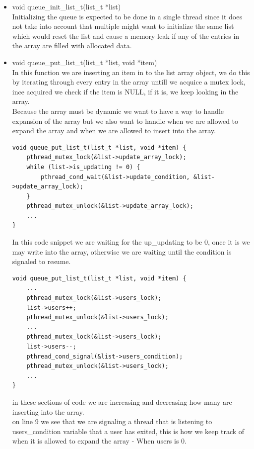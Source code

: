 \documentclass[a4paper,12pt,danish]{report}
\begin{document}
\begin{itemize}
  \item{void queue\_init\_list\_t(list\_t *list)}
  \\
  Initializing the queue is expected to be done in a single thread since it does not take into account that multiple might want to initialize the same list which would reset the list and cause a memory leak if any of the entries in the array are filled with allocated data.
  \item{void queue\_put\_list\_t(list\_t *list, void *item)}
  \\
  In this function we are inserting an item in to the list array object, we do this by iterating through every entry in the array untill we acquice a mutex lock, ince acquired we check if the item is NULL, if it is, we keep looking in the array.
  \\
  Because the array must be dynamic we want to have a way to handle expansion of the array but we also want to handle when we are allowed to expand the array and when we are allowed to insert into the array.
  \\
\begin{lstlisting}
void queue_put_list_t(list_t *list, void *item) {
    pthread_mutex_lock(&list->update_array_lock);
    while (list->is_updating != 0) {
        pthread_cond_wait(&list->update_condition, &list->update_array_lock);
    }
    pthread_mutex_unlock(&list->update_array_lock);
    ...
}
\end{lstlisting}
  In this code snippet we are waiting for the up\_updating to be 0, once it is we may write into the array, otherwise we are waiting until the condition is signaled to resume.
  \\
\begin{lstlisting}
void queue_put_list_t(list_t *list, void *item) {
    ...
    pthread_mutex_lock(&list->users_lock);
    list->users++;
    pthread_mutex_unlock(&list->users_lock);
    ...
    pthread_mutex_lock(&list->users_lock);
    list->users--;
    pthread_cond_signal(&list->users_condition);
    pthread_mutex_unlock(&list->users_lock);
    ...
}
\end{lstlisting}
   in these sections of code we are increasing and decreasing how many are inserting into the array.
   \\
   on line 9 we see that we are signaling a thread that is listening to users\_condition variable that a user has exited, this is how we keep track of when it is allowed to expand the array - When users is 0.
   \\

\end{itemize}
\end{document}
